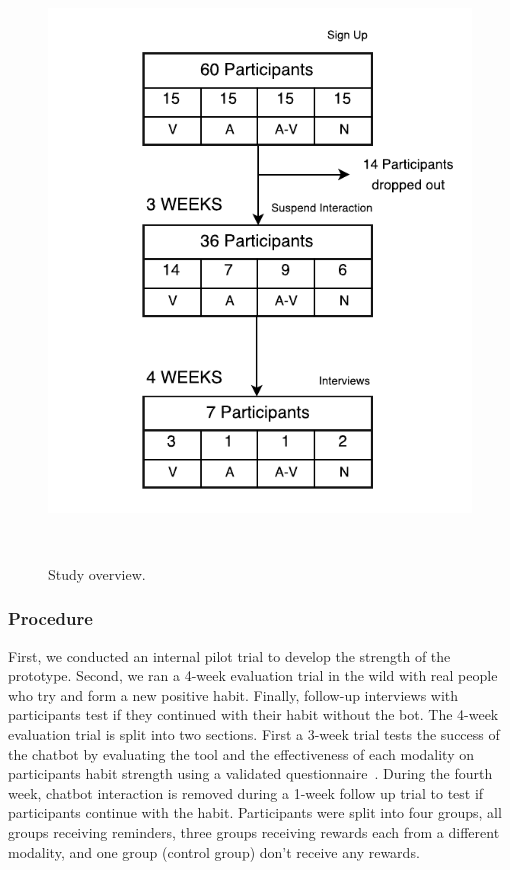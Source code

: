 \documentclass{scaffold/sigchi}
\begin{document}
\begin{figure}
  \centering
  \includegraphics[width=.8\columnwidth]{figures/study-flow}
  \caption{Study overview.}~\label{fig:study_flow}
\end{figure}
 
\subsubsection{Procedure}
First, we conducted an internal pilot trial to develop the strength of the prototype. Second, we ran a 4-week evaluation trial in the wild with real people who try and form a new positive habit. Finally, follow-up interviews with participants test if they continued with their habit without the bot.\newline
\newline
The 4-week evaluation trial is split into two sections. First a 3-week trial tests the success of the chatbot by evaluating the tool and the effectiveness of each modality on participants habit strength using a validated questionnaire~\cite{article_habit_measurement}. During the fourth week, chatbot interaction is removed during a 1-week follow up trial to test if participants continue with the habit. Participants were split into four groups, all groups receiving reminders, three groups receiving rewards each from a different modality, and one group (control group) don't receive any rewards.
\end{document}
